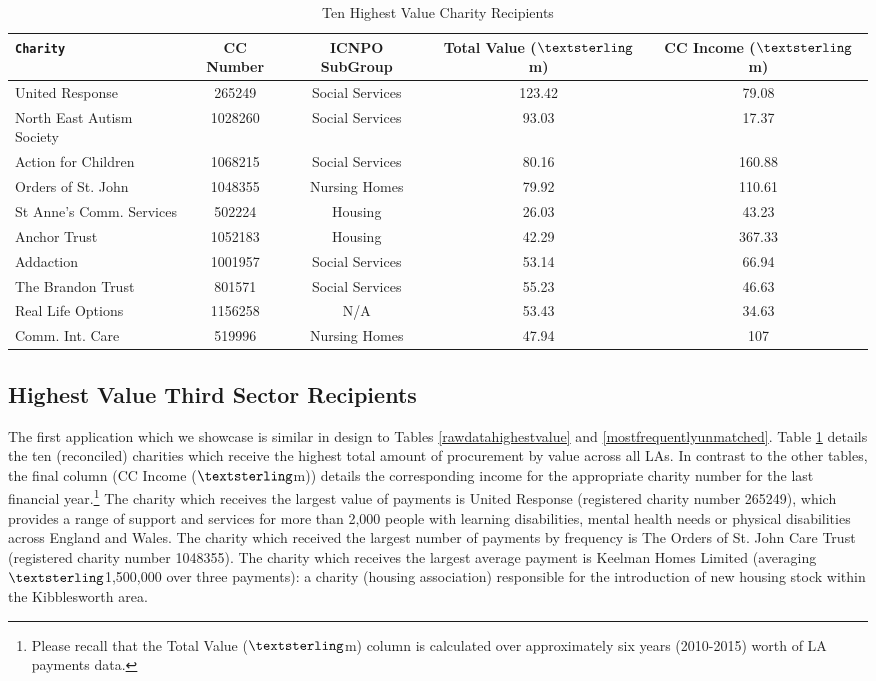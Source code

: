 \documentclass[12pt]{article}
\begin{document}
\begin{table}[!b]
\centering
\caption{Ten Highest Value Charity Recipients}
\begin{small}
\label{highestvaluecharity}
\begin{tabular}{lcccc}
\toprule
\texttt{Charity} & CC Number & ICNPO  SubGroup & Total Value ($\textsterling$m) & CC Income ($\textsterling$m) \\  \midrule
United Response & 265249 & Social Services & 123.42 & 79.08  \\ 
North East Autism Society & 1028260 & Social Services & 93.03 & 17.37\\
Action for Children & 1068215 & Social Services & 80.16 & 160.88\\
Orders of St. John & 1048355 & Nursing Homes & 79.92 & 110.61\\
St Anne's Comm. Services & 502224 & Housing & 26.03 & 43.23\\
Anchor Trust & 1052183 & Housing & 42.29 & 367.33\\
Addaction & 1001957 & Social Services & 53.14 & 66.94\\
The Brandon Trust & 801571 & Social Services & 55.23 & 46.63\\
Real Life Options & 1156258 & N/A & 53.43 & 34.63\\
Comm. Int. Care & 519996 & Nursing Homes & 47.94 & 107 \\ \bottomrule
\end{tabular}
\end{small}
\end{table}

\subsection{Highest Value Third Sector Recipients}

The first application which we showcase is similar in design to Tables \ref{rawdatahighestvalue} and \ref{mostfrequentlyunmatched}. Table \ref{highestvaluecharity} details the ten (reconciled) charities which receive the highest total amount of procurement by value across all LAs. In contrast to the other tables, the final column (CC Income ($\textsterling$m)) details the corresponding income for the appropriate charity number for the last financial year.\footnote{Please recall that the Total Value ($\textsterling$m) column is calculated over approximately six years (2010-2015) worth of LA payments data.} The charity which receives the largest value of payments is United Response (registered charity number 265249), which provides a range of support and services for more than 2,000 people with learning disabilities, mental health needs or physical disabilities across England and Wales. The charity which received the largest number of payments by frequency is The Orders of St. John Care Trust (registered charity number 1048355). The charity which receives the largest average payment is Keelman Homes Limited (averaging $\textsterling$1,500,000 over three payments): a charity (housing association) responsible for the introduction of new housing stock within the Kibblesworth area.
\end{document}
